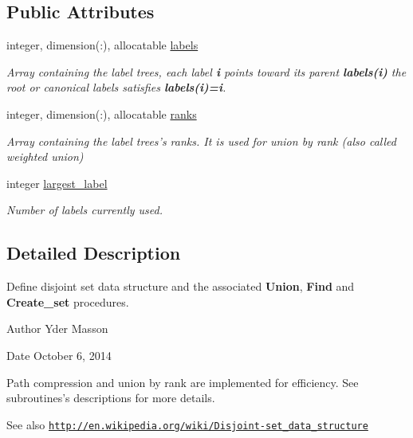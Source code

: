 \subsection*{\-Public \-Attributes}
\begin{DoxyCompactItemize}
\item 
integer, dimension(\-:), allocatable \hyperlink{classmodule__disjoint__set_afd35cdfbb8e055e9e184b5359627bf5e}{labels}
\begin{DoxyCompactList}\small\item\em \-Array containing the label trees, each label {\bfseries i} points toward its parent {\bfseries labels(i)} the root or canonical labels satisfies {\bfseries labels(i)=i}. \end{DoxyCompactList}\item 
integer, dimension(\-:), allocatable \hyperlink{classmodule__disjoint__set_af861c992aa8ba85ccc2943ec786d9ceb}{ranks}
\begin{DoxyCompactList}\small\item\em \-Array containing the label trees's ranks. \-It is used for union by rank (also called weighted union) \end{DoxyCompactList}\item 
integer \hyperlink{classmodule__disjoint__set_a2ef0620ab0fd7047b16e522c4db4c590}{largest\-\_\-label}
\begin{DoxyCompactList}\small\item\em \-Number of labels currently used. \end{DoxyCompactList}\end{DoxyCompactItemize}


\subsection{\-Detailed \-Description}
\-Define disjoint set data structure and the associated {\bfseries \-Union}, {\bfseries \-Find} and {\bfseries \-Create\-\_\-set} procedures. 

\begin{DoxyAuthor}{\-Author}
\-Yder \-Masson 
\end{DoxyAuthor}
\begin{DoxyDate}{\-Date}
\-October 6, 2014
\end{DoxyDate}
\-Path compression and union by rank are implemented for efficiency. \-See subroutines's descriptions for more details. \begin{DoxySeeAlso}{\-See also}
\href{http://en.wikipedia.org/wiki/Disjoint-set_data_structure}{\tt http\-://en.\-wikipedia.\-org/wiki/\-Disjoint-\/set\-\_\-data\-\_\-structure} 
\end{DoxySeeAlso}



